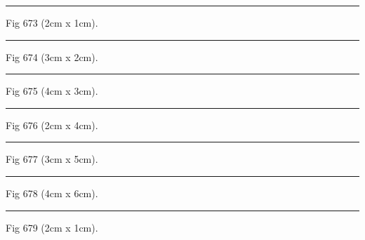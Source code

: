 \documentclass[a4paper,11pt]{article}
\begin{document}
\begin{swarmwrap}%
  \begin{minipage}[t]{2cm}
    \centering
    \rule{\linewidth}{1cm}
    {\footnotesize Fig 673 (2cm x 1cm).}
  \end{minipage}%
\end{swarmwrap}%
\swarmwrapnext
\lipsum[73]%

\begin{swarmwrap}%
  \begin{minipage}[t]{3cm}
    \centering
    \rule{\linewidth}{2cm}
    {\footnotesize Fig 674 (3cm x 2cm).}
  \end{minipage}%
\end{swarmwrap}%
\swarmwrapnext
\lipsum[74]%

\begin{swarmwrap}%
  \begin{minipage}[t]{4cm}
    \centering
    \rule{\linewidth}{3cm}
    {\footnotesize Fig 675 (4cm x 3cm).}
  \end{minipage}%
\end{swarmwrap}%
\swarmwrapnext
\lipsum[75]%

\begin{swarmwrap}%
  \begin{minipage}[t]{2cm}
    \centering
    \rule{\linewidth}{4cm}
    {\footnotesize Fig 676 (2cm x 4cm).}
  \end{minipage}%
\end{swarmwrap}%
\swarmwrapnext
\lipsum[76]%

\begin{swarmwrap}%
  \begin{minipage}[t]{3cm}
    \centering
    \rule{\linewidth}{5cm}
    {\footnotesize Fig 677 (3cm x 5cm).}
  \end{minipage}%
\end{swarmwrap}%
\swarmwrapnext
\lipsum[77]%

\begin{swarmwrap}%
  \begin{minipage}[t]{4cm}
    \centering
    \rule{\linewidth}{6cm}
    {\footnotesize Fig 678 (4cm x 6cm).}
  \end{minipage}%
\end{swarmwrap}%
\swarmwrapnext
\lipsum[78]%

\begin{swarmwrap}%
  \begin{minipage}[t]{2cm}
    \centering
    \rule{\linewidth}{1cm}
    {\footnotesize Fig 679 (2cm x 1cm).}
  \end{minipage}%
\end{swarmwrap}%
\swarmwrapnext
\lipsum[79]%
\end{document}
